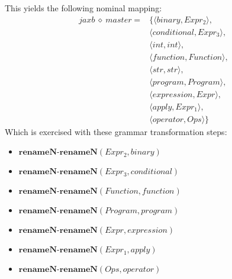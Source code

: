 This yields the following nominal mapping:
\begin{align*}\mathit{jaxb} \:\diamond\: \mathit{master} =& \{\langle \mathit{binary},\mathit{Expr_2}\rangle,\\
 & \langle \mathit{conditional},\mathit{Expr_3}\rangle,\\
 & \langle int,int\rangle,\\
 & \langle \mathit{function},\mathit{Function}\rangle,\\
 & \langle str,str\rangle,\\
 & \langle \mathit{program},\mathit{Program}\rangle,\\
 & \langle \mathit{expression},\mathit{Expr}\rangle,\\
 & \langle \mathit{apply},\mathit{Expr_1}\rangle,\\
 & \langle \mathit{operator},\mathit{Ops}\rangle\}\end{align*}
 Which is exercised with these grammar transformation steps:

{\footnotesize\begin{itemize}
\item $\mathbf{renameN\text{-}renameN}\left(\mathit{Expr_2},\mathit{binary}\right)$
\item $\mathbf{renameN\text{-}renameN}\left(\mathit{Expr_3},\mathit{conditional}\right)$
\item $\mathbf{renameN\text{-}renameN}\left(\mathit{Function},\mathit{function}\right)$
\item $\mathbf{renameN\text{-}renameN}\left(\mathit{Program},\mathit{program}\right)$
\item $\mathbf{renameN\text{-}renameN}\left(\mathit{Expr},\mathit{expression}\right)$
\item $\mathbf{renameN\text{-}renameN}\left(\mathit{Expr_1},\mathit{apply}\right)$
\item $\mathbf{renameN\text{-}renameN}\left(\mathit{Ops},\mathit{operator}\right)$
\end{itemize}}

